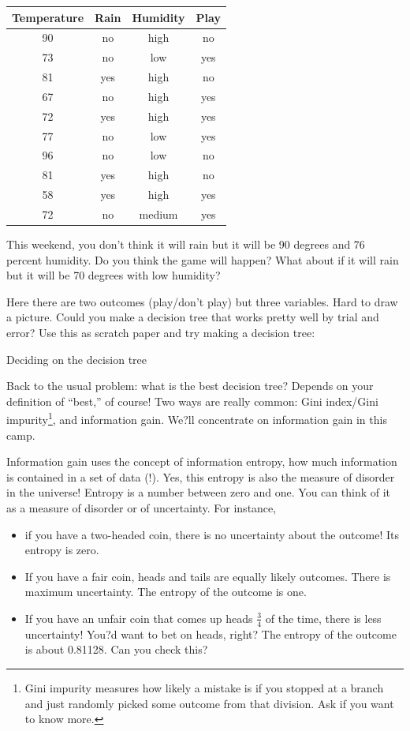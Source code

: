 \documentclass[10pt]{article}
\begin{document}
\begin{center}

\begin{tabular}{|c|c|c|c|}
\hline
Temperature &
Rain &
Humidity &
Play \\
\hline
90 &
no &
high &
no \\
73&
no&
low&
yes \\
81&
yes&
high&
no \\
67&
no&
high&
yes\\
72&
yes&
high&
yes\\
77&
no&
low&
yes\\
96 &
no&
low&
no\\
81&
yes&
high&
no\\
58&
yes&
high&
yes\\
72&
no&
medium&
yes\\
\hline
\end{tabular}
\end{center}

This weekend, you don't think it will rain but it will be 90 degrees and 76 percent humidity. Do you think the game will happen? What about if it will rain but it will be 70 degrees with low humidity?

\vfill
Here there are two outcomes (play/don't play) but three variables. Hard to draw a picture. Could you make a decision tree that works pretty well by trial and error? Use this as scratch paper and try making a decision tree:
\vfill
\pagebreak


\begin{center}
Deciding on the decision tree
\end{center}
Back to the usual problem: what is the best decision tree? Depends on your definition of ``best,'' of course! Two ways are really common: Gini index/Gini impurity\footnote{Gini impurity measures how likely a mistake is if you stopped at a branch and just randomly picked some outcome from that division. Ask if you want to know more.}, and information gain. We?ll concentrate on information gain in this camp.


Information gain uses the concept of information entropy, how much information is contained in a set of data (!). Yes, this entropy is also the measure of disorder in the universe! Entropy is a number between zero and one. You can think of it as a measure of disorder or of uncertainty. For instance, 
\begin{itemize}
\item if you have a two-headed coin, there is no uncertainty about the outcome! Its entropy is zero.
\item If you have a fair coin, heads and tails are equally likely outcomes. There is maximum uncertainty. The entropy of the outcome is one.
\item  If you have an unfair coin that comes up heads $\frac{3}{4}$ of the time, there is less uncertainty! You?d want to bet on heads, right? The entropy of the outcome is about 0.81128. 
Can you check this?
\end{itemize}
\end{document}
